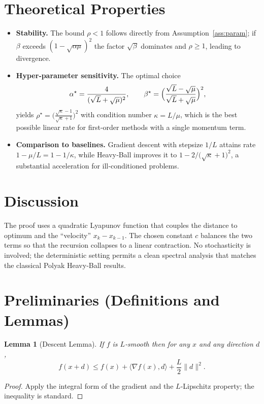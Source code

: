\documentclass{article}
\newtheorem{lemma}{Lemma}
\begin{document}
\section*{Theoretical Properties}
\begin{itemize}
\item \textbf{Stability.} The bound $\rho<1$ follows directly from Assumption~\ref{ass:param}; if $\beta$ exceeds $(1-\sqrt{\alpha\mu})^{2}$ the factor $\sqrt{\beta}$ dominates and $\rho\ge1$, leading to divergence.
\item \textbf{Hyper‑parameter sensitivity.} The optimal choice
\[
\alpha^{\star}=\frac{4}{(\sqrt{L}+\sqrt{\mu})^{2}},\qquad
\beta^{\star}=\Bigl(\frac{\sqrt{L}-\sqrt{\mu}}{\sqrt{L}+\sqrt{\mu}}\Bigr)^{2},
\]
yields $\rho^{\star}= \bigl(\frac{\sqrt{\kappa}-1}{\sqrt{\kappa}+1}\bigr)^{2}$ with condition number $\kappa=L/\mu$, which is the best possible linear rate for first‑order methods with a single momentum term.
\item \textbf{Comparison to baselines.} Gradient descent with stepsize $1/L$ attains rate $1-\mu/L=1-1/\kappa$, while Heavy‑Ball improves it to $1-2/\bigl(\sqrt{\kappa}+1\bigr)^{2}$, a substantial acceleration for ill‑conditioned problems.
\end{itemize}

\section*{Discussion}
The proof uses a quadratic Lyapunov function that couples the distance to optimum and the ``velocity'' $x_{k}-x_{k-1}$.  The chosen constant $c$ balances the two terms so that the recursion collapses to a linear contraction.  No stochasticity is involved; the deterministic setting permits a clean spectral analysis that matches the classical Polyak Heavy‑Ball results.

\newpage
\section*{Preliminaries (Definitions and Lemmas)}
\begin{lemma}[Descent Lemma]\label{lem:descent}
If $f$ is $L$‑smooth then for any $x$ and any direction $d$,
\[
f(x+d)\le f(x)+\langle\nabla f(x),d\rangle+\frac{L}{2}\|d\|^{2}.
\]
\end{lemma}
\begin{proof}
Apply the integral form of the gradient and the $L$‑Lipschitz property; the inequality is standard. \hfill\qedsymbol
\end{proof}
\end{document}

